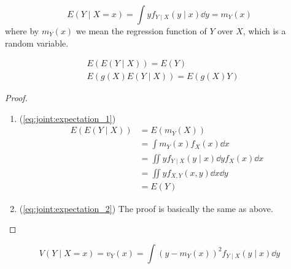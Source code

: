 \documentclass[14pt]{extarticle}
\begin{document}
\begin{definition}
    \begin{equation}
        E(Y \mid X = x) = \int y f_{Y  \mid  X}(y  \mid  x) \dd{y} = m_Y(x)
    \end{equation}
    where by $m_Y(x)$ we mean the regression function of $Y$ over $X$, which is a random variable.
\end{definition}

\begin{theorem}
    \label{thm:condition:prop_expectation}
    \begin{align}
         & E(E(Y \mid X)) = E(Y) \label{eq:joint:expectation_1}         \\
         & E(g(X)E(Y \mid X)) = E(g(X)Y) \label{eq:joint:expectation_2}
    \end{align}
\end{theorem}

\begin{proof}
    \skiplineafterproof
    \begin{enumerate}[label=\roman*.]
        \item (\autoref{eq:joint:expectation_1})
              \begin{align}
                  E(E(Y \mid X)) & = E(m_Y(X))                                           \\
                                 & = \int m_Y(x) f_X(x) \dd{x}                           \\
                                 & = \iint y f_{Y \mid X}(y \mid x) \dd{y} f_X(x) \dd{x} \\
                                 & = \iint y f_{X, Y}(x, y) \dd{x} \dd{y}                \\
                                 & = E(Y)
              \end{align}
        \item (\autoref{eq:joint:expectation_2}) The proof is basically the same as above.
    \end{enumerate}
\end{proof}

\begin{definition}
    \begin{equation}
        V(Y  \mid  X = x) = v_Y(x) = \int \left(y - m_Y(x) \right)^2 f_{Y \mid X}(y \mid x) \dd{y}
    \end{equation}
\end{definition}
\end{document}
